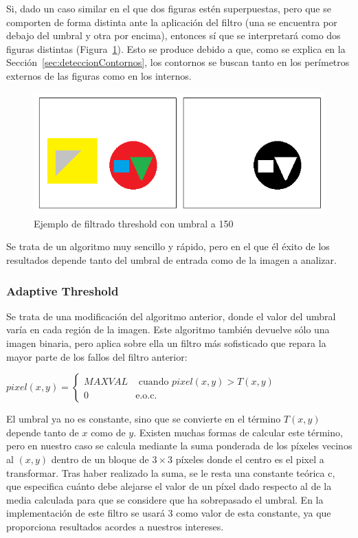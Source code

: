 {	Si, dado un caso similar en el que dos figuras estén superpuestas, pero que se comporten de forma distinta ante la aplicación del filtro (una se encuentra por debajo del umbral y otra por encima), entonces sí que se interpretará como dos figuras distintas (Figura~\ref{fig:threshold2}). Esto se produce debido a que, como se explica en la Sección~\ref{sec:deteccionContornos}, los contornos se buscan tanto en los perímetros externos de las figuras como en los internos.
	
		\begin{figure}[!htbp]
		\centering
		\includegraphics[scale=0.47]{graphics/threshold2.png}
		\caption{Ejemplo de filtrado threshold con umbral a 150}
		\label{fig:threshold2}
		\end{figure}
		
	Se trata de un algoritmo muy sencillo y rápido, pero en el que él éxito de los resultados depende tanto del umbral de entrada como de la imagen a analizar.
		
	\subsubsection{Adaptive Threshold}
	
	Se trata de una modificación del algoritmo anterior, donde el valor del umbral varía en cada región de la imagen. Este algoritmo también devuelve sólo una imagen binaria, pero aplica sobre ella un filtro más sofisticado que repara la mayor parte de los fallos del filtro anterior:

	\begin{center}
		$pixel(x,y) = \left\{
		\begin{array}{cc}
		MAXVAL 	& \text{ cuando } pixel(x,y) > T(x,y)\\ 
		0 	    & 	\text{e.o.c.}
		\end{array}\right.$
	\end{center}
	
	El umbral ya no es constante, sino que se convierte en el término $T(x,y)$ depende tanto de $x$ como de $y$. Existen muchas formas de calcular este término, pero en nuestro caso se calcula mediante la suma ponderada de los píxeles vecinos al $(x,y)$ dentro de un bloque de $3\times3$ píxeles donde el centro es el pixel a transformar. Tras haber realizado la suma, se le resta una constante teórica c, que especifica cuánto debe alejarse el valor de un píxel dado respecto al de la media calculada para que se considere que ha sobrepasado el umbral. En la implementación de este filtro se usará 3 como valor de esta constante, ya que proporciona resultados acordes a nuestros intereses.
	
}
